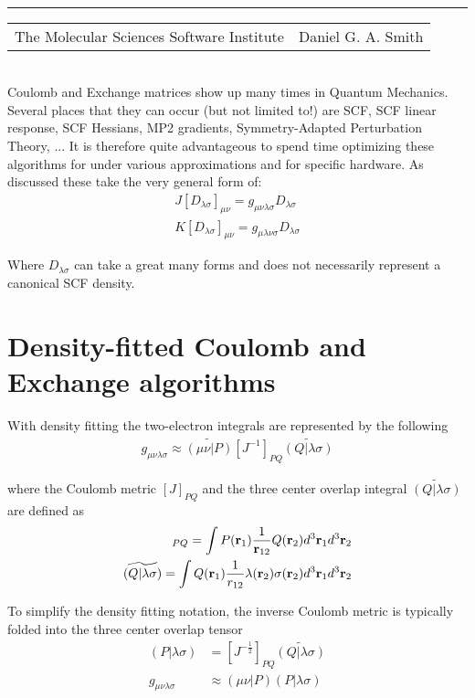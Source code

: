 \documentclass[aip,jcp,preprint,superscriptaddress,floatfix]{revtex4-1}
\renewcommand{\title}[1]{\textbf{\large{#1}}\\}
\newcommand{\leftright}[2]{\begin{tabularx}{\textwidth}{X>{\raggedleft}X}#1%
& #2\\\end{tabularx}\\[-1cm]}
\begin{document}
\title{}
\rule{\textwidth}{1pt}
\leftright{The Molecular Sciences Software Institute}{Daniel G. A. Smith} %

\bigskip
Coulomb and Exchange matrices show up many times in Quantum Mechanics. Several places that they can occur (but not limited to!) are SCF, SCF linear response, SCF Hessians, MP2 gradients, Symmetry-Adapted Perturbation Theory, ... It is therefore quite advantageous to spend time optimizing these algorithms for under various approximations and for specific hardware. As discussed these take the very general form of:
\begin{eqnarray}
J[D_{\lambda \sigma}]_{\mu \nu} =   g_{\mu \nu \lambda \sigma} D_{\lambda \sigma}\\
K[D_{\lambda \sigma}]_{\mu \nu} =   g_{\mu \lambda \nu \sigma} D_{\lambda \sigma} 
\end{eqnarray}

Where $D_{\lambda \sigma}$ can take a great many forms and does not necessarily represent a canonical SCF density.

\section{Density-fitted Coulomb and Exchange algorithms}

With density fitting\cite{Weigend:2002ga, Vahtras:1993db, Dunlap:1979gh, Whitten:1973ju} the two-electron integrals are represented by the following
\begin{eqnarray}
g_{\mu \nu \lambda \sigma} \approx \widetilde{(\mu \nu |P)} [J^{-1}]_{PQ} \widetilde{(Q| \lambda \sigma)}
\end{eqnarray}

where the Coulomb metric $[J]_{PQ}$ and the three center overlap integral $\widetilde{(Q| \lambda \sigma)} $ are defined as
\begin{eqnarray}
[J]_{PQ} = \int P({\bf r}_1) \frac{1}{{\bf r}_{12}}Q({\bf r}_2)d^3{\bf r}_1d^3{\bf r}_2\\
\widetilde{(Q| \lambda \sigma)} = \int Q({\bf r}_1)\frac{1}{r_{12}} \lambda({\bf r}_2) \sigma({\bf r}_2)d^3{\bf r}_1d^3{\bf r}_2
\end{eqnarray}

To simplify the density fitting notation, the inverse Coulomb metric is typically folded into the three center overlap tensor
\begin{align}
(P| \lambda \sigma) &= [J^{-\frac{1}{2}}]_{PQ} \widetilde{(Q| \lambda \sigma)}\\
g_{\mu \nu \lambda \sigma} &\approx (\mu \nu |P) (P| \lambda \sigma)
\end{align}
\end{document}
